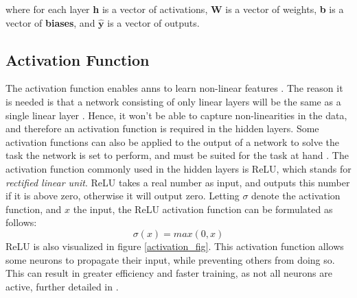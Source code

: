         
        
        
        where for each layer \textbf{h} is a vector of activations, \textbf{W} is a vector of weights, \textbf{b} is a  vector of \textbf{biases}, and $\hat{\textbf{y}}$ is a vector of outputs. %
        
        
    \subsection{Activation Function} \label{activation function}
        The activation function enables \gls{ann}s to learn non-linear features \cite{razavi2021deep_exp_per}. The reason it is needed is that a network consisting of only linear layers will be the same as a single linear layer \cite{razavi2021deep_exp_per}. Hence, it won't be able to capture non-linearities in the data, and therefore an activation function is required in the hidden layers. Some activation functions can also be applied to the output of a network to solve the task the network is set to perform, and must be suited for the task at hand \cite{Goodfellow-et-al-2016_out_activation}. The activation function commonly used in the hidden layers is ReLU, which stands for \textit{rectified linear unit}\cite{sharma2019new_activation_func}. ReLU takes a real number as input, and outputs this number if it is above zero,  otherwise it will output zero. Letting $\sigma$ denote the activation function, and $x$ the input, the ReLU activation function can be formulated as follows:
            \begin{equation} \label{relu_eq}
                \sigma(x) = max(0,x)
            \end{equation}
        ReLU is also visualized in figure \ref{activation_fig}. This activation function allows some neurons to propagate their input, while preventing others from doing so. This can result in greater efficiency and faster training, as not all neurons are active, further detailed in \citeauthor{sharma2019new_activation_func}\cite{sharma2019new_activation_func}. 
        
